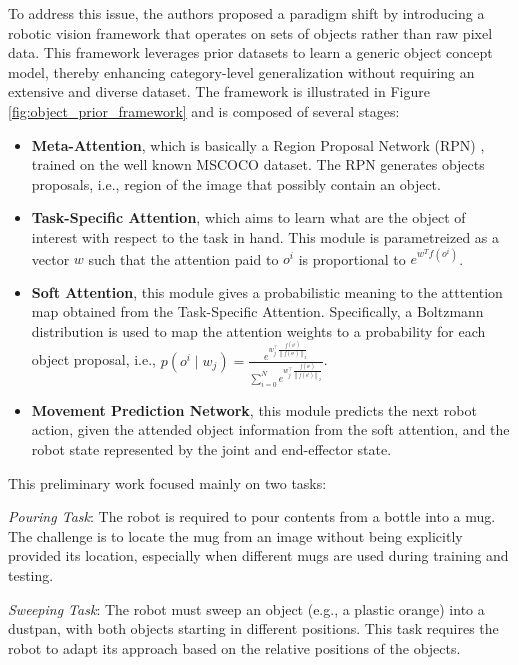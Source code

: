To address this issue, the authors proposed a paradigm shift by introducing a robotic vision framework that operates on sets of objects rather than raw pixel data. This framework leverages prior datasets to learn a generic object concept model, thereby enhancing category-level generalization without requiring an extensive and diverse dataset. The framework is illustrated in Figure \ref{fig:object_prior_framework} and is composed of several stages:
\begin{itemize}
    \item \textbf{Meta-Attention}, which is basically a Region Proposal Network (RPN) \cite{fastrcnn}, trained on the well known MSCOCO \cite{lin2014microsoft} dataset. The RPN generates objects proposals, i.e., region of the image that possibly contain an object.
    \item \textbf{Task-Specific Attention}, which aims to learn what are the object of interest with respect to the task in hand. This module is parametreized as a vector $w$ such that the attention paid to $o^i$ is proportional to $e^{w^Tf(o^i)}$.
    \item \textbf{Soft Attention}, this module gives a probabilistic meaning to the atttention map obtained from the Task-Specific Attention. Specifically, a Boltzmann distribution is used to map the attention weights to a probability for each object proposal, i.e., $p\left(o^i \mid w_j\right)=\frac{e^{w_j^{\top} \frac{f\left(o^i\right)}{\left\|f\left(o^i\right)\right\|_2}}}{\sum_{i=0}^N e^{w_j^{\top} \frac{f\left(o^i\right)}{\left\|f\left(o^i\right)\right\|_2}}}$.
    \item \textbf{Movement Prediction Network}, this module predicts the next robot action, given the attended object information from the soft attention, and the robot state represented by the joint and end-effector state.
\end{itemize}

This preliminary work focused mainly on two tasks:
\begin{itemize*}
    \item  \textit{Pouring Task}: The robot is required to pour contents from a bottle into a mug. The challenge is to locate the mug from an image without being explicitly provided its location, especially when different mugs are used during training and testing.
    \item \textit{Sweeping Task}: The robot must sweep an object (e.g., a plastic orange) into a dustpan, with both objects starting in different positions. This task requires the robot to adapt its approach based on the relative positions of the objects.
\end{itemize*}
